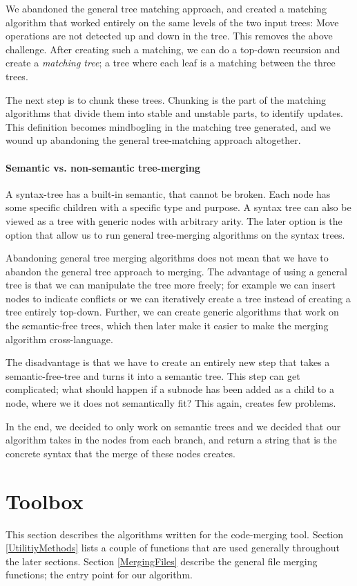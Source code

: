 \documentclass[11pt]{article}
\begin{document}
We abandoned the general tree matching approach, and created a matching algorithm that worked entirely on the same levels of the two input trees: Move operations are not detected up and down in the tree. This removes the above challenge. After creating such a matching, we can do a top-down recursion and create a \textit{matching tree}; a tree where each leaf is a matching between the three trees. 

The next step is to chunk these trees. Chunking is the part of the matching algorithms that divide them into stable and unstable parts, to identify updates. This definition becomes mindbogling in the matching tree generated, and we wound up abandoning the general tree-matching approach altogether.
 
\paragraph{Semantic vs. non-semantic tree-merging} A syntax-tree has a built-in semantic, that cannot be broken. Each node has some specific children with a specific type and purpose. A syntax tree can also be viewed as a tree with generic nodes with arbitrary arity. The later option is the option that allow us to run general tree-merging algorithms on the syntax trees.

Abandoning general tree merging algorithms does not mean that we have to abandon the general tree approach to merging. The advantage of using a general tree is that we can manipulate the tree more freely; for example we can insert nodes to indicate conflicts or we can iteratively create a tree instead of creating a tree entirely top-down. Further, we can create generic algorithms that work on the semantic-free trees, which then later make it easier to make the merging algorithm cross-language.

The disadvantage is that we have to create an entirely new step that takes a semantic-free-tree and turns it into a semantic tree. This step can get complicated; what should happen if a subnode has been added as a child to a node, where we it does not semantically fit? This again, creates few problems.

In the end, we decided to only work on semantic trees and we decided that our algorithm takes in the nodes from each branch, and return a string that is the concrete syntax that the merge of these nodes creates.

\clearpage

\section{Toolbox}
This section describes the algorithms written for the code-merging tool. Section \ref{UtilitiyMethods} lists a couple of functions that are used generally throughout the later sections. Section \ref{MergingFiles} describe the general file merging functions; the entry point for our algorithm. 
\end{document}
